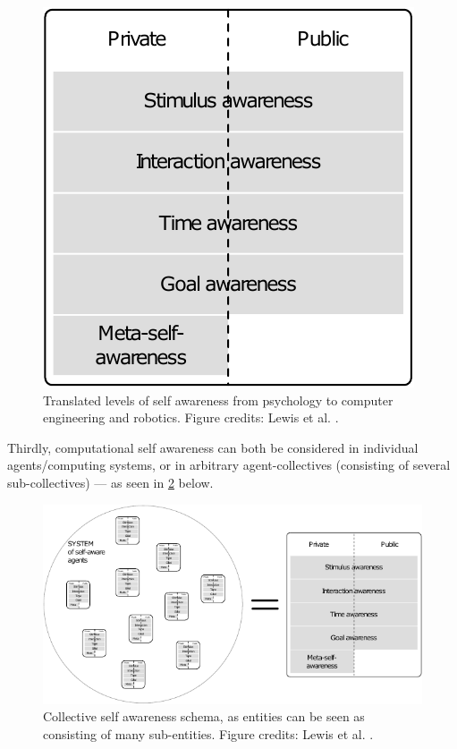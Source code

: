 	\begin{figure}[!htp]
		\centering
		\includegraphics[width=0.5\columnwidth]{Assets/DocSegments/Chapters/Background/Figures/Schema/SA_levels.pdf}
		\caption[Translated levels of self awareness from psychology to computer engineering and robotics.]{Translated levels of self awareness from psychology to computer engineering and robotics. Figure credits: Lewis et al. \cite{sacs16_ch2}.}
		\label{fig:comp_SA_levels}
	\end{figure}

	Thirdly, computational self awareness can both be considered in individual agents/computing systems, or in arbitrary agent-collectives (consisting of several sub-collectives) — as seen in \ref{fig:collective_SA} below.

	\begin{figure}[!htp]
		\centering
		\includegraphics[width=\columnwidth]{Assets/DocSegments/Chapters/Background/Figures/Schema/collective_SA.pdf}
		\caption[Collective self awareness schema.]{Collective self awareness schema, as entities can be seen as consisting of many sub-entities. Figure credits: Lewis et al. \cite{sacs16_ch2}.}
		\label{fig:collective_SA}
	\end{figure}


